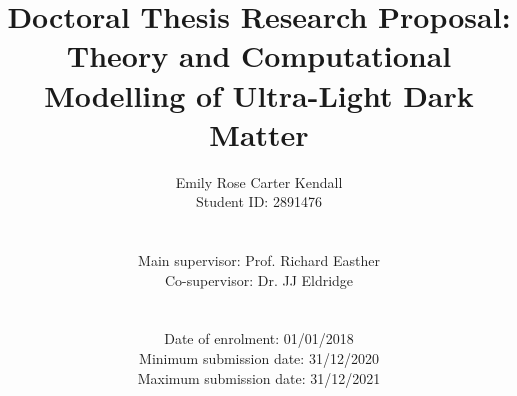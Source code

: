 \documentclass[a4paper]{article}
\title{Doctoral Thesis Research Proposal: Theory and Computational Modelling of Ultra-Light Dark Matter}
\author{Emily Rose Carter Kendall \\ Student ID: 2891476 \\ \\ \\ Main supervisor: Prof. Richard Easther \\ Co-supervisor: Dr. JJ Eldridge \\ \\ \\ Date of enrolment: 01/01/2018 \\ Minimum submission date: 31/12/2020 \\ Maximum submission date: 31/12/2021}
\date{}
\begin{document}
\maketitle
\pagebreak





\end{document}
